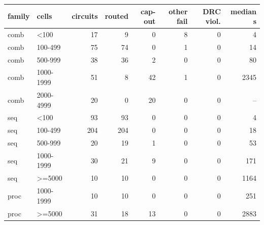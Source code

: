 \begin{tabular}{llrrrrrr}
\hline
family & cells & circuits & routed & cap-out & other fail & DRC viol. & median s \\
\hline
comb & <100 & 17 & 9 & 0 & 8 & 0 & 4 \\
comb & 100-499 & 75 & 74 & 0 & 1 & 0 & 14 \\
comb & 500-999 & 38 & 36 & 2 & 0 & 0 & 80 \\
comb & 1000-1999 & 51 & 8 & 42 & 1 & 0 & 2345 \\
comb & 2000-4999 & 20 & 0 & 20 & 0 & 0 & -- \\
seq & <100 & 93 & 93 & 0 & 0 & 0 & 4 \\
seq & 100-499 & 204 & 204 & 0 & 0 & 0 & 18 \\
seq & 500-999 & 20 & 19 & 1 & 0 & 0 & 53 \\
seq & 1000-1999 & 30 & 21 & 9 & 0 & 0 & 171 \\
seq & >=5000 & 10 & 10 & 0 & 0 & 0 & 1164 \\
proc & 1000-1999 & 10 & 10 & 0 & 0 & 0 & 251 \\
proc & >=5000 & 31 & 18 & 13 & 0 & 0 & 2883 \\
\hline
\end{tabular}
